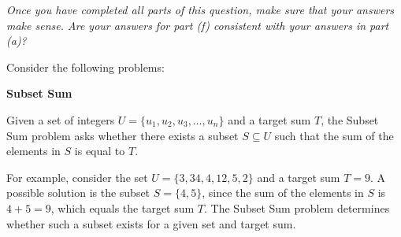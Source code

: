\documentclass[12pt]{exam}
\newcommand{\stars}[1]{%
    \foreach \n in {1,...,#1}{%
        $\filledstar$%
    }%
}
\begin{document}
\begin{questions}

    \textit{Once you have completed all parts of this question, make sure that your answers make sense. Are your answers for part (f) consistent with your answers in part (a)?}

    \clearpage

    \question[40][W14, \stars{5}]
    Consider the following problems:
    \begin{mdframed}
        \textbf{Subset Sum}

        Given a set of integers $U = \{u_1, u_2, u_3, \dots, u_n\}$ and a target sum $T$, the Subset Sum problem asks whether there exists a subset $S \subseteq U$ such that the sum of the elements in $S$ is equal to $T$.

        For example, consider the set $U = \{3, 34, 4, 12, 5, 2\}$ and a target sum $T = 9$. A possible solution is the subset $S = \{4, 5\}$, since the sum of the elements in $S$ is $4 + 5 = 9$, which equals the target sum $T$. The Subset Sum problem determines whether such a subset exists for a given set and target sum.
    \end{mdframed}


\end{questions}
\end{document}

